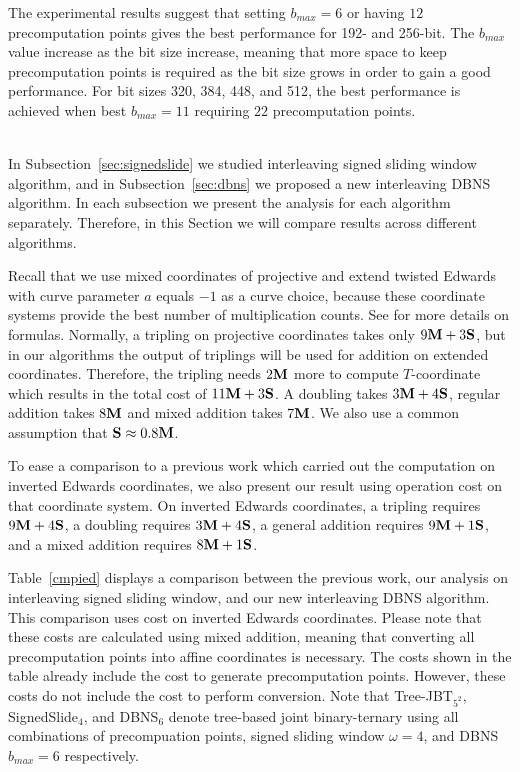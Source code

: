 The experimental results suggest that setting $b_{max} = 6$ or having $12$ precomputation points gives the best performance for 192- and 256-bit.
The $b_{max}$ value increase as the bit size increase, meaning that more space to keep precomputation points is required as the bit size grows
in order to gain a good performance.
For bit sizes 320, 384, 448, and 512, the best performance is achieved when  best $b_{max} = 11$ requiring $22$ precomputation points.



 \\

In Subsection~\ref{sec:signedslide} we studied interleaving signed sliding window algorithm,
and in Subsection~\ref{sec:dbns} we proposed a new interleaving DBNS algorithm.
In each subsection we present the analysis for each algorithm separately.
Therefore, in this Section we will compare results across different algorithms.

Recall that we use mixed coordinates of projective and extend twisted Edwards with curve parameter $a$ equals $-1$ as a curve choice,
because these coordinate systems provide the best number of multiplication counts.
See \cite{EFD} for more details on formulas.
Normally, a tripling on projective coordinates takes only $9\text{\bf M} + 3\text{\bf S}$,
but in our algorithms the output of triplings will be used for addition on extended coordinates.
Therefore, the tripling needs $2\text{\bf M}$ more to compute $T$-coordinate which results in the total cost of $11\text{\bf M} + 3\text{\bf S}$.
A doubling takes $3\text{\bf M} + 4\text{\bf S}$, regular addition takes $8\text{\bf M}$ and mixed addition takes $7\text{\bf M}$.
We also use a common assumption that $\text{\bf S} \approx 0.8\text{\bf M}$.

To ease a comparison to a previous work \cite{DKS09} which carried out the computation on inverted Edwards coordinates,
we also present our result using operation cost on that coordinate system.
On inverted Edwards coordinates, a tripling requires $9\text{\bf M} + 4\text{\bf S}$, a doubling requires $3\text{\bf M} + 4\text{\bf S}$, a general addition requires $9\text{\bf M} + 1\text{\bf S}$,
and a mixed addition requires $8\text{\bf M} + 1\text{\bf S}$.

Table~\ref{cmpied} displays a comparison between the previous work\cite{DKS09},
our analysis on interleaving signed sliding window,
and our new interleaving DBNS algorithm.
This comparison uses cost on inverted Edwards coordinates.
Please note that these costs are calculated using mixed addition, meaning that converting all precomputation points into affine coordinates is necessary.
The costs shown in the table already include the cost to generate precomputation points.
However, these costs do not include the cost to perform conversion.
Note that Tree-JBT$_{5^2}$, SignedSlide$_4$, and DBNS$_6$ denote tree-based joint binary-ternary using all combinations of precompuation points,
signed sliding window $\omega = 4$, and DBNS $b_{max} = 6$ respectively.

